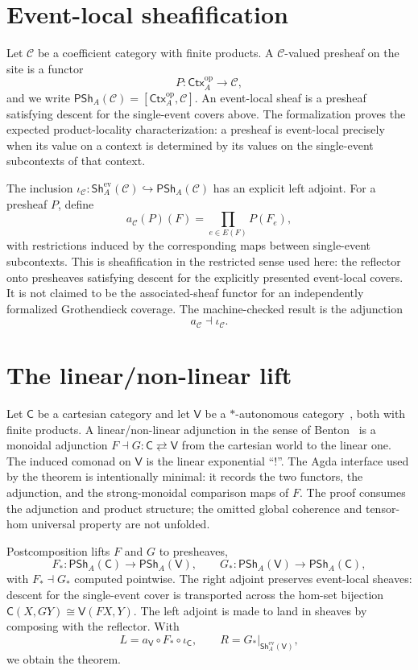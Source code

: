 \documentclass[11pt]{article}
\newcommand{\PSh}{\mathsf{PSh}}
\newcommand{\EvSh}{\mathsf{Sh}^{\mathrm{ev}}}
\newcommand{\Ctx}{\mathsf{Ctx}}
\newcommand{\Cart}{\mathsf{C}}
\newcommand{\Vcat}{\mathsf{V}}
\newcommand{\op}{\mathrm{op}}
\begin{document}
\section*{Event-local sheafification}

Let $\mathcal C$ be a coefficient category with finite products. A
$\mathcal C$-valued presheaf on the site is a functor
\[
  P : \Ctx_A^{\op}\longrightarrow\mathcal C,
\]
and we write $\PSh_A(\mathcal C)=[\Ctx_A^{\op},\mathcal C]$. An event-local
sheaf is a presheaf satisfying descent for the single-event covers above. The
formalization proves the expected product-locality characterization: a presheaf
is event-local precisely when its value on a context is determined by its values
on the single-event subcontexts of that context.

The inclusion
$\iota_{\mathcal C}:\EvSh_A(\mathcal C)\hookrightarrow\PSh_A(\mathcal C)$ has an
explicit left adjoint. For a presheaf $P$, define
\[
  a_{\mathcal C}(P)(F)=\prod_{e\in E(F)} P(F_e),
\]
with restrictions induced by the corresponding maps between single-event
subcontexts. This is sheafification in the restricted sense used here: the
reflector onto presheaves satisfying descent for the explicitly presented
event-local covers. It is not claimed to be the associated-sheaf functor for an
independently formalized Grothendieck coverage. The machine-checked result is
the adjunction
\[
  a_{\mathcal C}\dashv\iota_{\mathcal C}.
\]

\section*{The linear/non-linear lift}

Let $\Cart$ be a cartesian category and let $\Vcat$ be a $*$-autonomous
category~\cite{Barr1979}, both with finite products. A linear/non-linear
adjunction in the sense of Benton~\cite{Benton1995} is a monoidal adjunction
$F\dashv G:\Cart\rightleftarrows\Vcat$ from the cartesian world to the linear
one. The induced comonad on $\Vcat$ is the linear exponential ``$!$''. The Agda
interface used by the theorem is intentionally minimal: it records the two
functors, the adjunction, and the strong-monoidal comparison maps of $F$. The
proof consumes the adjunction and product structure; the omitted global
coherence and tensor-hom universal property are not unfolded.

Postcomposition lifts $F$ and $G$ to presheaves,
\[
  F_* : \PSh_A(\Cart)\to\PSh_A(\Vcat),
  \qquad
  G_* : \PSh_A(\Vcat)\to\PSh_A(\Cart),
\]
with $F_*\dashv G_*$ computed pointwise. The right adjoint preserves
event-local sheaves: descent for the single-event cover is transported across
the hom-set bijection $\Cart(X,GY)\cong\Vcat(FX,Y)$. The left adjoint is made to
land in sheaves by composing with the reflector. With
\[
  L=a_{\Vcat}\circ F_*\circ\iota_{\Cart},
  \qquad
  R=G_*|_{\EvSh_A(\Vcat)},
\]
we obtain the theorem.
\end{document}
